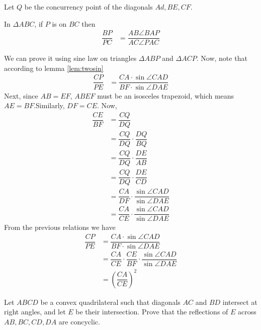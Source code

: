 \documentclass{subfile}
\begin{document}
	\begin{solution}
		Let $Q$ be the concurrency point of the diagonals $Ad,BE,CF$.
			\begin{lemma}\label{lem:twosin}
				In $\Delta ABC$, if $P$ is on $BC$ then
					\begin{align*}
						\dfrac{BP}{PC} & = \dfrac{AB\angle BAP}{AC\angle PAC}
					\end{align*}
			\end{lemma}
		We can prove it using sine law on triangles $\Delta ABP$ and $\Delta ACP$. Now, note that according to lemma \eqref{lem:twosin}
			\begin{align*}
				\dfrac{CP}{PE} &=\dfrac{CA\cdot \sin \angle CAD}{BF\cdot \sin \angle DAE}
			\end{align*}
		Next, since $AB=EF$, $ABEF$ must be an isosceles trapezoid, which means $AE=BF$.Similarly, $DF=CE$. Now,
			\begin{align*}
			    \dfrac{CE}{BF} & =\dfrac{CQ}{DQ}\\
			                   & =\dfrac{CQ}{DQ}\cdot \dfrac{DQ}{BQ}\\
			                   & =\dfrac{CQ}{DQ}\cdot \dfrac{DE}{AB}\\
			                   & =\dfrac{CQ}{DQ}\cdot \dfrac{DE}{CD}\\
			                   & =\dfrac{CA}{DF}\cdot \dfrac{\sin \angle CAD}{\sin \angle DAE}\\
			                   & =\dfrac{CA}{CE}\cdot \dfrac{\sin \angle CAD}{\sin \angle DAE}
		   \end{align*}
		From the previous relations we have
			\begin{align*}
				\dfrac{CP}{PE}& =\dfrac{CA\cdot \sin \angle CAD}{BF\cdot \sin \angle DAE}\\
							  & =\dfrac{CA}{CE}\cdot \dfrac{CE}{BF}\cdot \dfrac{\sin \angle CAD}{\sin \angle DAE}\\
							  & =\left(\dfrac{CA}{CE}\right)^{2}
			\end{align*}
	\end{solution}
	
	
	\begin{problem}
		Let $ABCD$ be a convex quadrilateral such that diagonals $AC$ and $BD$ intersect at right angles, and let $E$ be their intersection. Prove that the reflections of $E$ across $AB,BC,CD,DA$ are concyclic. 
	\end{problem}
	
\end{document}
